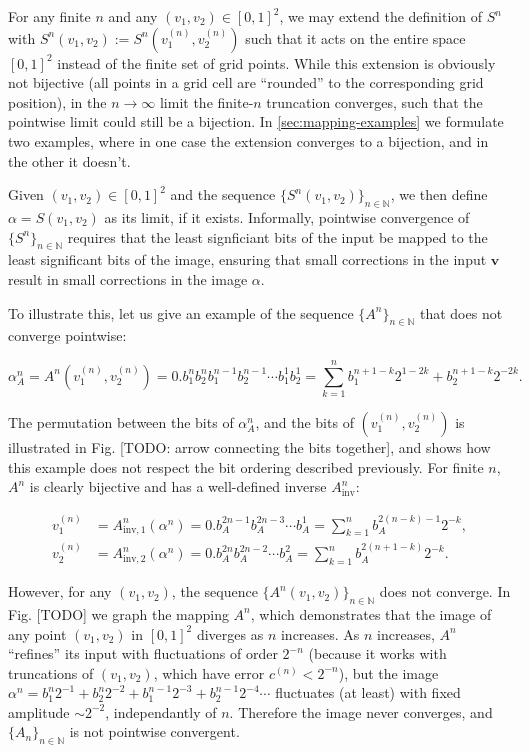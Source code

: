 \documentclass[10pt,letterpaper]{article}
\renewcommand{\vec}[1]{\boldsymbol{#1}}
\begin{document}
For any finite $n$ and any $(v_1,v_2) \in [0,1]^2$, we may extend the definition of $S^n$ with $S^n(v_1, v_2) := S^n(v_1^{(n)}, v_2^{(n)})$ such that it acts on the entire space $[0,1]^2$ instead of the finite set of grid points. While this extension is obviously not bijective (all points in a grid cell are ``rounded'' to the corresponding grid position), in the $n \to \infty$ limit the finite-$n$ truncation converges, such that the pointwise limit could still be a bijection. In \autoref{sec:mapping-examples} we formulate two examples, where in one case the extension converges to a bijection, and in the other it doesn't.

Given $(v_1, v_2) \in [0,1]^2$ and the sequence $\{S^n(v_1, v_2)\}_{n \in \mathbb N}$, we then define $\alpha = S(v_1, v_2)$ as its limit, if it exists. Informally, pointwise convergence of $\{S^n\}_{n\in\mathbb N}$ requires that the least signficiant bits of the input be mapped to the least significant bits of the image, ensuring that small corrections in the input $\vec{v}$ result in small corrections in the image $\alpha$.

To illustrate this, let us give an example of the sequence $\{A^n\}_{n \in \mathbb N}$ that does not converge pointwise:

\begin{equation*}
\alpha_A^n = A^n(v_1^{(n)},v_2^{(n)}) = 0.b_1^n b_2^n b_1^{n-1} b_2^{n-1} \cdots b_1^1 b_2^1 = \sum_{k=1}^n b_1^{n+1-k} 2^{1-2k} + b_2^{n+1-k} 2^{-2k}.
\end{equation*}

The permutation between the bits of $\alpha^n_A$, and the bits of $(v_1^{(n)}, v_2^{(n)})$ is illustrated in Fig. [TODO: arrow connecting the bits together], and shows how this example does not respect the bit ordering described previously.
For finite $n$, $A^n$ is clearly bijective and has a well-defined inverse $A^n_\textrm{inv}$:

\begin{equation*} \begin{aligned}
v_1^{(n)} &= A^n_{\textrm{inv},1}(\alpha^n) = 0.b_A^{2n-1} b_A^{2n-3} \cdots b_A^1 = \sum_{k=1}^n b_A^{2(n-k)-1} 2^{-k}, \\
v_2^{(n)} &= A^n_{\textrm{inv},2}(\alpha^n) = 0.b_A^{2n} b_A^{2n-2} \cdots b_A^2 = \sum_{k=1}^n b_A^{2(n+1-k)} 2^{-k}.
\end{aligned} \end{equation*}

However, for any $(v_1,v_2)$, the sequence $\{A^n(v_1, v_2)\}_{n \in \mathbb N}$ does not converge. In Fig. [TODO] we graph the mapping $A^n$, which demonstrates that the image of any point $(v_1,v_2)$ in $[0,1]^2$ diverges as $n$ increases. As $n$ increases, $A^n$ ``refines'' its input with fluctuations of order $2^{-n}$ (because it works with truncations of $(v_1, v_2)$, which have error $c^{(n)} < 2^{-n}$), but the image $\alpha^n=b_1^n 2^{-1} + b_2^n 2^{-2} + b_1^{n-1} 2^{-3} + b_2^{n-1} 2^{-4} \cdots$ fluctuates (at least) with fixed amplitude $\sim 2^{-2}$, independantly of $n$. Therefore the image never converges, and $\{A_n\}_{n \in \mathbb N}$ is not pointwise convergent.
\end{document}
